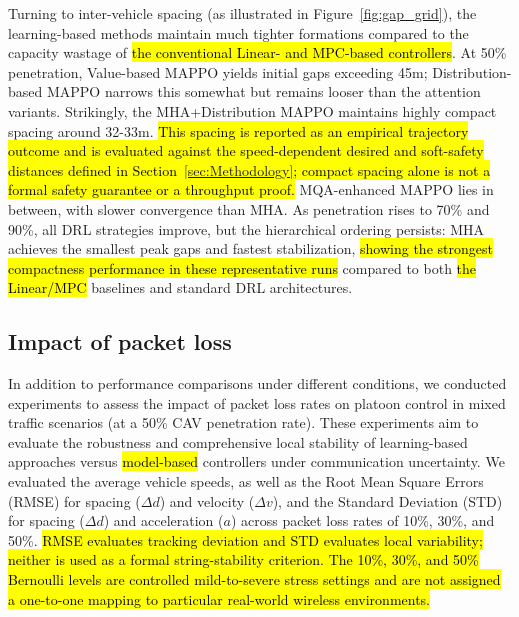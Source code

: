 \documentclass{ieeeaccess}
\begin{document}
Turning to inter-vehicle spacing (as illustrated in Figure~\ref{fig:gap_grid}), the learning-based methods maintain much tighter formations compared to the capacity wastage of \hl{the conventional Linear- and MPC-based controllers}. At 50\% penetration, Value-based MAPPO yields initial gaps exceeding 45m; Distribution-based MAPPO narrows this somewhat but remains looser than the attention variants. Strikingly, the MHA+Distribution MAPPO maintains highly compact spacing around 32-33m. \hl{This spacing is reported as an empirical trajectory outcome and is evaluated against the speed-dependent desired and soft-safety distances defined in Section~\ref{sec:Methodology}; compact spacing alone is not a formal safety guarantee or a throughput proof.} MQA-enhanced MAPPO lies in between, with slower convergence than MHA. As penetration rises to 70\% and 90\%, all DRL strategies improve, but the hierarchical ordering persists: MHA achieves the smallest peak gaps and fastest stabilization, \hl{showing the strongest compactness performance in these representative runs} compared to both \hl{the Linear/MPC} baselines and standard DRL architectures.


\subsection{Impact of packet loss}
\label{sec:impact_packet_loss}

In addition to performance comparisons under different conditions, we conducted experiments to assess the impact of packet loss rates on platoon control in mixed traffic scenarios (at a 50\% CAV penetration rate). These experiments aim to evaluate the robustness and comprehensive local stability of learning-based approaches versus \hl{model-based} controllers under communication uncertainty. We evaluated the average vehicle speeds, as well as the Root Mean Square Errors (RMSE) for spacing ($\Delta d$) and velocity ($\Delta v$),  and the Standard Deviation (STD) for spacing ($\Delta d$) and acceleration ($a$) across packet loss rates of 10\%, 30\%, and 50\%. \hl{RMSE evaluates tracking deviation and STD evaluates local variability; neither is used as a formal string-stability criterion. The 10\%, 30\%, and 50\% Bernoulli levels are controlled mild-to-severe stress settings and are not assigned a one-to-one mapping to particular real-world wireless environments.}
\end{document}
